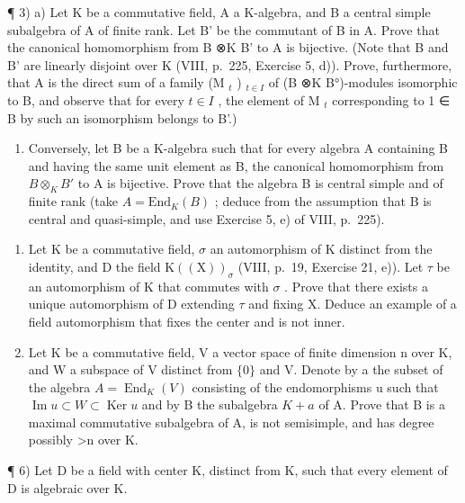 ¶ 3) a) Let K be a commutative field, A a K-algebra, and B a central simple subalgebra of A of finite rank. Let B' be the commutant of B in A. Prove that the canonical homomorphism from B ⊗K B' to A is bijective. (Note that B and B' are linearly disjoint over K (VIII, p.~225, Exercise 5, d)). Prove, furthermore, that A is the direct sum of a family (M \(_{t}\) ) \(_{t\in I}\) of (B ⊗K B°)-modules isomorphic to B, and observe that for every \(t\in I\) , the element of M \(_{t}\) corresponding to 1 ∈ B by such an isomorphism belongs to B'.)

\begin{enumerate}
\def\labelenumi{\alph{enumi})}
\setcounter{enumi}{1}
\tightlist
\item
  Conversely, let B be a K-algebra such that for every algebra A containing B and having the same unit element as B, the canonical homomorphism from \(B \otimes_{K} B'\) to A is bijective. Prove that the algebra B is central simple and of finite rank (take \(A = \text{End}_{K}(B)\) ; deduce from the assumption that B is central and quasi-simple, and use Exercise 5, e) of VIII, p.~225).
\end{enumerate}

\begin{enumerate}
\def\labelenumi{\arabic{enumi})}
\setcounter{enumi}{3}
\item
  Let \(\mathrm{K}\) be a commutative field, \(\sigma\) an automorphism of \(\mathrm{K}\) distinct from the identity, and \(\mathrm{D}\) the field \(\mathrm{K}((\mathrm{X}))_{\sigma}\) (VIII, p.~19, Exercise 21, e)). Let \(\tau\) be an automorphism of \(\mathrm{K}\) that commutes with \(\sigma\) . Prove that there exists a unique automorphism of \(\mathrm{D}\) extending \(\tau\) and fixing X. Deduce an example of a field automorphism that fixes the center and is not inner.
\item
  Let K be a commutative field, V a vector space of finite dimension n over K, and W a subspace of V distinct from \(\{0\}\) and V. Denote by a the subset of the algebra \(A = \operatorname{End}_{K}(V)\) consisting of the endomorphisms u such that \(\operatorname{Im} u \subset W \subset \operatorname{Ker} u\) and by B the subalgebra \(K + a\) of A. Prove that B is a maximal commutative subalgebra of A, is not semisimple, and has degree possibly \textgreater n over K.
\end{enumerate}

¶ 6) Let D be a field with center K, distinct from K, such that every element of D is algebraic over K.

